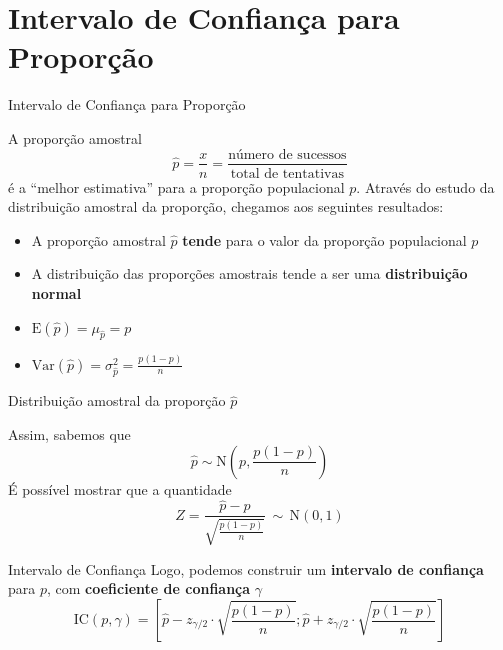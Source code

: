 \documentclass[14pt,aspectratio=1610]{beamer}
\begin{document}
	\section{Intervalo de Confiança para Proporção}
	\begin{frame}{Intervalo de Confiança para Proporção}
		\vspace{-0.3cm}
		\begin{block}{}
			\justifying
			A proporção amostral
			$$
			\hat{p} = \frac{x}{n} = \frac{\text{número de sucessos}}{\text{total de
					tentativas}}
			$$   
			é a ``melhor estimativa'' para a proporção populacional $p.$ Através do estudo da distribuição amostral da proporção, chegamos aos seguintes resultados:
			
			\begin{itemize}
				\item A proporção amostral $\hat{p}$ \textbf{tende} para o valor da proporção populacional $p$
				\item A distribuição das proporções amostrais tende a ser uma \textbf{distribuição normal}
				\item $\text{E}(\hat{p}) = \mu_{\hat{p}} = p$
				\item $\text{Var}(\hat{p}) = \sigma^{2}_{\hat{p}} = \frac{p(1-p)}{n}$
			\end{itemize}
		\end{block}
	\end{frame}
	
	\begin{frame}{Distribuição amostral da proporção $\hat{p}$}
		\begin{block}{}
			\justifying
			Assim, sabemos que
			$$
			\hat{p} \sim \text{N} \left( p, \frac{p(1-p)}{n} \right)
			$$   
			É possível mostrar que a quantidade
			$$
			Z = \frac{\hat{p} - p}{\sqrt{\frac{p(1-p)}{n}}} \, \sim \, \text{N}(0,1)
			$$   
		\end{block}
	\end{frame}
	
	\begin{frame}{}
		\begin{block}{Intervalo de Confiança}
			\justifying
			Logo, podemos construir um \textbf{intervalo de confiança} para $p$, com \textbf{coeficiente de confiança} $\gamma$
			$$
			\text{IC}(p, \gamma) = \left[ \hat{p} - z_{\gamma/2} \cdot
			\sqrt{\frac{p(1-p)}{n}} ;
			\hat{p} + z_{\gamma/2} \cdot
			\sqrt{\frac{p(1-p)}{n}}
			\right]
			$$
		\end{block}
	\end{frame}
	
\end{document}

